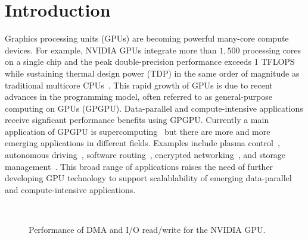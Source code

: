 \section{Introduction}
\label{sec:introduction}

Graphics processing units (GPUs) are becoming powerful many-core compute
devices.
For example, NVIDIA GPUs integrate more than $1,500$ processing cores on
a single chip and the peak double-precision performance exceeds 1
TFLOPS while sustaining thermal design power (TDP) in the same order of
magnitude as traditional multicore CPUs~\cite{NVIDIA_Kepler}. 
This rapid growth of GPUs is due to recent advances in the
programming model, often referred to as general-purpose computing on
GPUs (GPGPU).
Data-parallel and compute-intensive applications receive signficant
performance benefits using GPGPU.
Currently a main application of GPGPU is supercomputing~\cite{TOP500}
but there are more and more emerging applications in different fields.
Examples include plasma control~\cite{Kato_ICCPS13}, autonomous
driving~\cite{McNaughton_ICRA11}, software routing~\cite{Han_SIGCOMM10},
encrypted networking~\cite{Jang_NSDI11}, and storage
management~\cite{Bhatotia_FAST12, Gharaibeh_HPDC10, Kato_ATC12,
Sun_SYSTOR12}.
This broad range of applications raises the need of further developing
GPU technology to support scalablability of emerging data-parallel and
compute-intensive applications.

\begin{figure}[!t]
 \centering
 \\
 \caption{Performance of DMA and I/O read/write for the NVIDIA GPU.}
 \label{fig:intro_data_transfer}
\end{figure}

